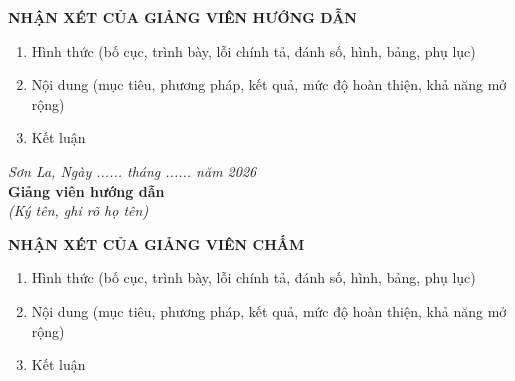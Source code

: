 \documentclass[12pt,a4paper]{article}
\begin{document}
	\newpage
	\thispagestyle{empty}
	\begin{center}
		\textbf{NHẬN XÉT CỦA GIẢNG VIÊN HƯỚNG DẪN}
	\end{center}
	
	\vspace{1cm}
	
	\begin{enumerate}
		\item Hình thức (bố cục, trình bày, lỗi chính tả, đánh số, hình, bảng, phụ lục)
		
		\vspace{3cm}
		
		\item Nội dung (mục tiêu, phương pháp, kết quả, mức độ hoàn thiện, khả năng mở rộng)
		
		\vspace{3cm}
		
		\item Kết luận
		
		\vspace{3cm}
	\end{enumerate}
	
	\vspace{1cm}
	
	\begin{flushright}
		\textit{Sơn La, Ngày ...... tháng ...... năm 2026}\\[0.5cm]
		\textbf{Giảng viên hướng dẫn}\\[0.3cm]
		\textit{(Ký tên, ghi rõ họ tên)}
	\end{flushright}
	
	\newpage
	\thispagestyle{empty}
	\begin{center}
		\textbf{NHẬN XÉT CỦA GIẢNG VIÊN CHẤM}
	\end{center}
	
	\vspace{1cm}
	
	\begin{enumerate}
		\item Hình thức (bố cục, trình bày, lỗi chính tả, đánh số, hình, bảng, phụ lục)
		
		\vspace{3cm}
		
		\item Nội dung (mục tiêu, phương pháp, kết quả, mức độ hoàn thiện, khả năng mở rộng)
		
		\vspace{3cm}
		
		\item Kết luận
		
		\vspace{3cm}
	\end{enumerate}
	
\end{document}
